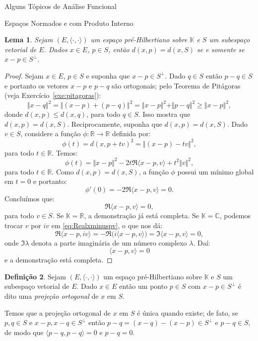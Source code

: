 \documentclass[oneside,final,11pt]{amsbook}
\newcommand{\R}{\mathds R}
\newcommand{\C}{\mathds C}
\newcommand{\K}{\mathds K}
\theoremstyle{remark}\newtheorem{exercise}{Exercício}[chapter]
\theoremstyle{remark}\newtheorem{*exercise}[exercise]{\hbox to 0pt{\hskip 0pt minus 1fil*}Exercício}
\theoremstyle{definition}\newtheorem{exdefin}{Definição}[chapter]
\theoremstyle{plain}\newtheorem{teo}{Teorema}[section]
\theoremstyle{plain}\newtheorem{lem}[teo]{Lema}
\theoremstyle{plain}\newtheorem{prop}[teo]{Proposição}
\theoremstyle{plain}\newtheorem{cor}[teo]{Corolário}
\theoremstyle{definition}\newtheorem{defin}[teo]{Definição}
\theoremstyle{remark}\newtheorem{rem}[teo]{Observação}
\theoremstyle{definition}\newtheorem{notation}[teo]{Notação}
\theoremstyle{definition}\newtheorem{convention}[teo]{Convenção}
\theoremstyle{definition}\newtheorem{example}[teo]{Exemplo}
\numberwithin{section}{chapter}
\numberwithin{equation}{section}
\begin{document}
\begin{chapter}{Alguns Tópicos de Análise Funcional}
\begin{section}{Espaços Normados e com Produto Interno}
\begin{lem}\label{thm:maisproxperp}
Sejam $(E,\langle\cdot,\cdot\rangle)$ um espaço pré-Hilbertiano sobre $\K$ e $S$ um subespaço vetorial de $E$.
Dados $x\in E$, $p\in S$, então $d(x,p)=d(x,S)$ se e somente se $x-p\in S^\perp$.
\end{lem}
\begin{proof}
Sejam $x\in E$, $p\in S$ e suponha que $x-p\in S^\perp$. Dado $q\in S$ então $p-q\in S$ e portanto
os vetores $x-p$ e $p-q$ são ortogonais; pelo Teorema de Pitágoras (veja Exercício~\ref{exe:pitagoras}):
\[\Vert x-q\Vert^2=\big\Vert(x-p)+(p-q)\big\Vert^2=\Vert x-p\Vert^2+\Vert p-q\Vert^2\ge\Vert x-p\Vert^2,\]
donde $d(x,p)\le d(x,q)$, para todo $q\in S$. Isso mostra que $d(x,p)=d(x,S)$. Reciprocamente, suponha que
$d(x,p)=d(x,S)$. Dado $v\in S$, considere a função $\phi:\R\to\R$ definida por:
\[\phi(t)=d(x,p+tv)^2=\Vert(x-p)-tv\Vert^2,\]
para todo $t\in\R$. Temos:
\[\phi(t)=\Vert x-p\Vert^2-2t\Re\langle x-p,v\rangle+t^2\Vert v\Vert^2,\]
para todo $t\in\R$. Como $d(x,p)=d(x,S)$, a função $\phi$ possui um mínimo global em $t=0$ e portanto:
\[\phi'(0)=-2\Re\langle x-p,v\rangle=0.\]
Concluímos que:
\begin{equation}\label{eq:Realxminuspv}
\Re\langle x-p,v\rangle=0,
\end{equation}
para todo $v\in S$. Se $\K=\R$, a demonstração já está completa. Se $\K=\C$, podemos trocar $v$ por $iv$ em \eqref{eq:Realxminuspv},
o que nos dá:
\[\Re\langle x-p,iv\rangle=-\Re\big(i\langle x-p,v\rangle\big)=\Im\langle x-p,v\rangle=0,\]
onde $\Im\lambda$\index[simbolos]{$\Im\lambda$} denota a parte imaginária de um número complexo
$\lambda$.%
Daí:
\[\langle x-p,v\rangle=0\]
e a demonstração está completa.
\end{proof}

\begin{defin}
Sejam $(E,\langle\cdot,\cdot\rangle)$ um espaço pré-Hilbertiano sobre $\K$ e $S$ um subespaço vetorial de $E$.
Dado $x\in E$ então um ponto $p\in S$ com $x-p\in S^\perp$ é dito uma {\em projeção ortogonal\/}
de $x$ em $S$.
\end{defin}
Temos que a projeção ortogonal de $x$ em $S$ é única quando existe; de fato, se $p,q\in S$ e
$x-p,x-q\in S^\perp$ então $p-q=(x-q)-(x-p)\in S^\perp$ e $p-q\in S$, de modo que $\langle p-q,p-q\rangle=0$
e $p-q=0$.


\end{section}
\end{chapter}
\end{document}
